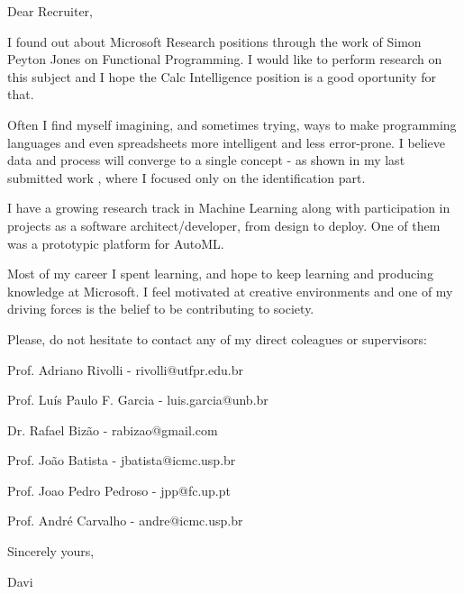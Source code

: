 \documentclass[letterpaper,11pt]{article}
\begin{document}
\vspace{40pt}

{\justifying
\Large
{}
Dear Recruiter,
\vspace{10pt}

I found out about Microsoft Research positions through the work of Simon Peyton Jones on Functional Programming. 
I would like to perform research on this subject and I hope the Calc Intelligence position is a good oportunity for that. 

Often I find myself imagining, and sometimes trying, ways to make programming languages and even spreadsheets more intelligent and less error-prone.
I believe data and process will converge to a single concept - as shown in my last submitted work \cite{pereirasantos2021predictable}, where I focused only on the identification part.

I have a growing research track in Machine Learning along with participation in projects as a software architect/developer, from design to deploy.
One of them was a prototypic platform for AutoML.

}

{\justifying
\Large
{}
Most of my career I spent learning, and hope to keep learning and producing knowledge at Microsoft.
I feel motivated at creative environments and one of my driving forces is the belief to be contributing to society.
\vspace{20pt}

Please, do not hesitate to contact any of my direct coleagues or supervisors:

Prof. Adriano Rivolli - rivolli@utfpr.edu.br

Prof. Luís Paulo F. Garcia - luis.garcia@unb.br

Dr. Rafael Bizão - rabizao@gmail.com

Prof. João Batista - jbatista@icmc.usp.br

Prof. Joao Pedro Pedroso - jpp@fc.up.pt

Prof. André Carvalho - andre@icmc.usp.br

}

{\justifying
\Large
{}
\vspace{30pt}
\hspace{420pt} Sincerely yours,
\vspace{10pt}

\hspace{420pt} Davi
}
\end{document}
